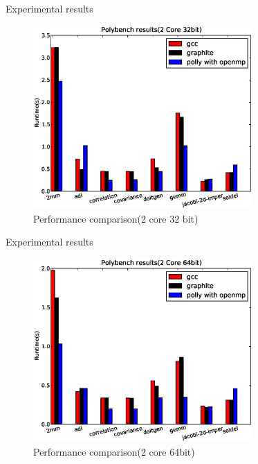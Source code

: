 \documentclass{beamer}
\begin{document}
\begin{frame}[allowframebreaks]{Experimental results}
\begin{figure}
\begin{center}
  \includegraphics[height=7cm]{images/2core32bit.eps}
  \caption{Performance comparison(2 core 32 bit)}
  \label{fig:2core1}
\end{center}
\end{figure}
\end{frame}

\begin{frame}[allowframebreaks]{Experimental results}
\begin{figure}
\begin{center}
  \includegraphics[height=7cm]{images/2core64bit.eps}
  \caption{Performance comparison(2 core 64bit)}
  \label{fig:2core2}
\end{center}
\end{figure}
\end{frame}
\end{document}
